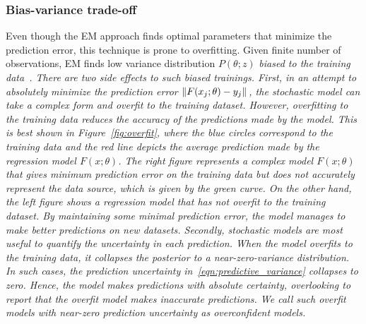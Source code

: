 \subsubsection{Bias-variance trade-off}
Even though the EM approach finds optimal parameters that minimize the
prediction error, this technique is prone to overfitting.
%
Given finite number of observations, EM finds low variance
distribution $P(\theta;z)$ \it{biased to the training
data}\normalfont~\cite{bishop2006pattern}. 
%
There are two side effects to such biased trainings.
%
First, in an attempt to absolutely minimize the prediction error $\|{F(x_j;
\theta) - y_j}\|_{{}_{}}$, the stochastic model can take a complex form and overfit to
the training dataset.
%
However, overfitting to the training data reduces the accuracy of the
predictions made by the model.
%
This is best shown in Figure~\ref{fig:overfit}, where the blue circles
correspond to the training data and the red line depicts the average prediction made by
the regression model $F(x; \theta)$.
%
The right figure represents a complex model $F(x;\theta)$ that gives minimum
prediction error on the training data but does not accurately represent the data
source, which is given by the green curve.
%
On the other hand, the left figure shows a regression model that has not overfit
to the training dataset.
%
By maintaining some minimal prediction error, the model manages to make better
predictions on new datasets.
%
Secondly, stochastic models are most useful to quantify the uncertainty in each
prediction. 
When the model overfits to the training data, it collapses the
posterior to a near-zero-variance distribution.
%
In such cases, the prediction uncertainty in~\eqref{eqn:predictive_variance}
collapses to zero.
%
Hence, the model makes predictions with absolute certainty, overlooking to report that 
the overfit model makes inaccurate predictions.
%
We call such overfit models with near-zero prediction uncertainty as
\textit{overconfident} models.


